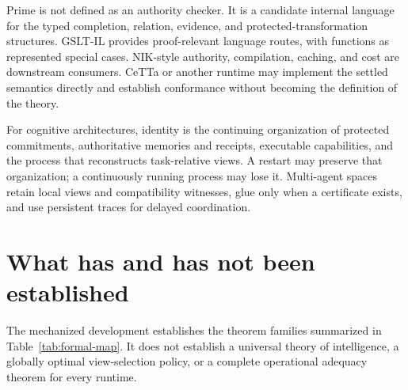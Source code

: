 \documentclass[11pt]{article}
\begin{document}
Prime is not defined as an authority checker.  It is a candidate internal language
for the typed completion, relation, evidence, and protected-transformation structures.
GSLT-IL provides proof-relevant language routes, with functions as represented special
cases.  NIK-style authority, compilation, caching, and cost are downstream consumers.
CeTTa or another runtime may implement the settled semantics directly and establish
conformance without becoming the definition of the theory.

For cognitive architectures, identity is the continuing organization of protected
commitments, authoritative memories and receipts, executable capabilities, and the
process that reconstructs task-relative views.  A restart may preserve that
organization; a continuously running process may lose it.  Multi-agent spaces retain
local views and compatibility witnesses, glue only when a certificate exists, and use
persistent traces for delayed coordination.

\section{What has and has not been established}

The mechanized development establishes the theorem families summarized in
Table~\ref{tab:formal-map}.  It does not establish a universal theory of intelligence,
a globally optimal view-selection policy, or a complete operational adequacy theorem
for every runtime.
\end{document}
